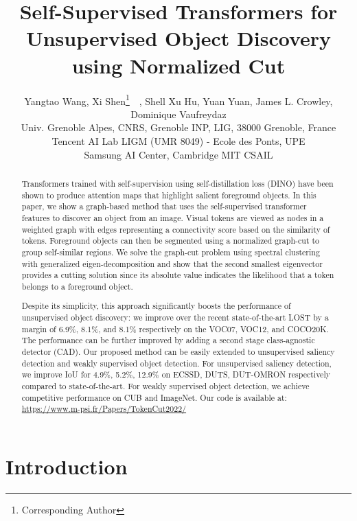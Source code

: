 \documentclass[twocolumn]{article}
\title{Self-Supervised Transformers for Unsupervised Object Discovery using Normalized Cut}
\author{Yangtao Wang, Xi Shen\thanks{Corresponding Author}~~, Shell Xu Hu, Yuan Yuan, James L. Crowley, Dominique Vaufreydaz \\
 Univ. Grenoble Alpes, CNRS, Grenoble INP, LIG, 38000 Grenoble, France\\
 Tencent AI Lab \hspace{5mm}
 LIGM (UMR 8049) - Ecole des Ponts, UPE \\
 Samsung AI Center, Cambridge \hspace{5mm}
 MIT CSAIL 
}
\begin{document}
\twocolumn[{\begin{@twocolumnfalse}
    \maketitle
  \end{@twocolumnfalse}
}]


\setcounter{footnote}{0}
\renewcommand{\thefootnote}{\fnsymbol{footnote}}

        \begin{abstract}
Transformers trained with self-supervision using self-distillation loss (DINO) have been shown to produce attention maps that highlight salient foreground objects. In this paper, we show a graph-based method that uses the self-supervised transformer features to discover an object from an image. Visual tokens are viewed as nodes in a weighted graph with edges representing a connectivity score based on the similarity of tokens. Foreground objects can then be segmented using a normalized graph-cut to group self-similar regions. We solve the graph-cut problem using spectral clustering with generalized eigen-decomposition and show that the second smallest eigenvector provides a cutting solution since its absolute value indicates the likelihood that a token belongs to a foreground object.

Despite its simplicity, this approach significantly boosts the performance of unsupervised object discovery: we improve over the recent state-of-the-art LOST by a margin of 6.9\%, 8.1\%, and 8.1\% respectively on the VOC07, VOC12, and COCO20K. The performance can be further improved by adding a second stage class-agnostic detector (CAD). Our proposed method can be easily extended to unsupervised saliency detection and weakly supervised object detection. For unsupervised saliency detection, we improve IoU for 4.9\%, 5.2\%, 12.9\% on ECSSD, DUTS, DUT-OMRON respectively compared to state-of-the-art. For weakly supervised object detection, we achieve competitive performance on CUB and ImageNet. Our code is available at:
\href{https://www.m-psi.fr/Papers/TokenCut2022/}{https://www.m-psi.fr/Papers/TokenCut2022/}
\end{abstract}
    

\section{Introduction}
\end{document}
